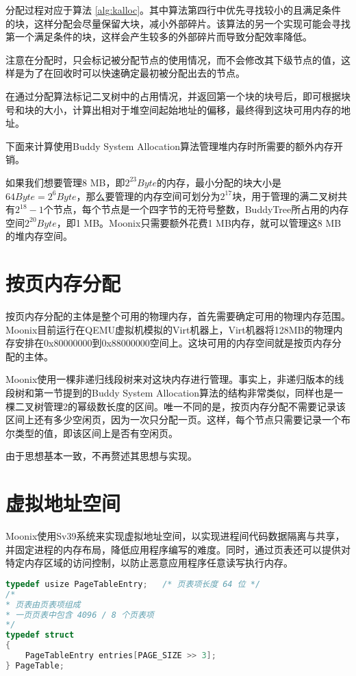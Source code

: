\vspace{12 pt}

分配过程对应于算法 \ref{alg:kalloc}。其中算法第四行中优先寻找较小的且满足条件的块，这样分配会尽量保留大块，减小外部碎片。该算法的另一个实现可能会寻找第一个满足条件的块，这样会产生较多的外部碎片而导致分配效率降低。

注意在分配时，只会标记被分配节点的使用情况，而不会修改其下级节点的值，这样是为了在回收时可以快速确定最初被分配出去的节点。

在通过分配算法标记二叉树中的占用情况，并返回第一个块的块号后，即可根据块号和块的大小，计算出相对于堆空间起始地址的偏移，最终得到这块可用内存的地址。

下面来计算使用Buddy System Allocation算法管理堆内存时所需要的额外内存开销。

如果我们想要管理8 MB，即$2^{23} Byte$的内存，最小分配的块大小是$64 Byte = 2^6 Byte$，那么要管理的内存空间可划分为$2^{17}$块，用于管理的满二叉树共有$2^{18} - 1$个节点，每个节点是一个四字节的无符号整数，BuddyTree所占用的内存空间$2^{20} Byte$，即1 MB。Moonix只需要额外花费1 MB内存，就可以管理这8 MB的堆内存空间。

\section{按页内存分配}

按页内存分配的主体是整个可用的物理内存，首先需要确定可用的物理内存范围。Moonix目前运行在QEMU虚拟机模拟的Virt机器上，Virt机器将128MB的物理内存安排在0x80000000到0x88000000空间上。这块可用的内存空间就是按页内存分配的主体。

Moonix使用一棵非递归线段树来对这块内存进行管理。事实上，非递归版本的线段树和第一节提到的Buddy System Allocation算法的结构非常类似，同样也是一棵二叉树管理2的幂级数长度的区间。唯一不同的是，按页内存分配不需要记录该区间上还有多少空闲页，因为一次只分配一页。这样，每个节点只需要记录一个布尔类型的值，即该区间上是否有空闲页。

由于思想基本一致，不再赘述其思想与实现。

\section{虚拟地址空间}

Moonix使用Sv39系统来实现虚拟地址空间，以实现进程间代码数据隔离与共享，并固定进程的内存布局，降低应用程序编写的难度。同时，通过页表还可以提供对特定内存区域的访问控制，以防止恶意应用程序任意读写执行内存。

\begin{minipage}[c]{0.95\textwidth}
\begin{lstlisting}[language={C}, caption={页表相关数据结构定义}, label={lst:pagetable}]
typedef usize PageTableEntry;   /* 页表项长度 64 位 */
/*
* 页表由页表项组成 
* 一页页表中包含 4096 / 8 个页表项
*/
typedef struct
{
	PageTableEntry entries[PAGE_SIZE >> 3];
} PageTable;
\end{lstlisting}
\end{minipage}

